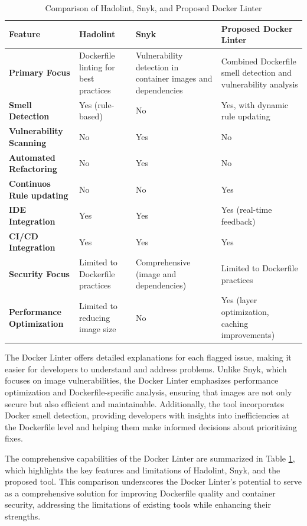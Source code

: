 \begin{table}[ht]
    \centering
        \begin{tabular}{|p{3.5cm}|p{3.5cm}|p{3.5cm}|p{3.5cm}|}
            \hline
            \textbf{Feature} & \textbf{Hadolint} & \textbf{Snyk} & \textbf{Proposed Docker Linter} \\ \hline
            \textbf{Primary Focus} & Dockerfile linting for best practices & Vulnerability detection in container images and dependencies & Combined Dockerfile smell detection and vulnerability analysis \\ \hline
            \textbf{Smell Detection} & Yes (rule-based) & No & Yes, with dynamic rule updating \\ \hline
            \textbf{Vulnerability Scanning} & No & Yes & No \\ \hline
            \textbf{Automated Refactoring} & No & Yes & No \\ \hline
            \textbf{Continuos Rule updating} & No & No & Yes \\ \hline
            \textbf{IDE Integration} & Yes & Yes & Yes (real-time feedback) \\ \hline
            \textbf{CI/CD Integration} & Yes & Yes & Yes \\ \hline
            \textbf{Security Focus} & Limited to Dockerfile practices & Comprehensive (image and dependencies) &Limited to Dockerfile practices \\ \hline
            \textbf{Performance Optimization} & Limited to reducing image size & No & Yes (layer optimization, caching improvements) \\ \hline
            \end{tabular}
        \caption{Comparison of Hadolint, Snyk, and Proposed Docker Linter}
        \label{tab:tool_comparison}
\end{table}

The Docker Linter offers detailed explanations for each flagged issue, making it easier for developers to understand and address problems. Unlike Snyk, which focuses on image vulnerabilities, the Docker Linter emphasizes performance optimization and Dockerfile-specific analysis, ensuring that images are not only secure but also efficient and maintainable. Additionally, the tool incorporates Docker smell detection, providing developers with insights into inefficiencies at the Dockerfile level and helping them make informed decisions about prioritizing fixes.

The comprehensive capabilities of the Docker Linter are summarized in Table \ref{tab:tool_comparison}, which highlights the key features and limitations of Hadolint, Snyk, and the proposed tool. This comparison underscores the Docker Linter’s potential to serve as a comprehensive solution for improving Dockerfile quality and container security, addressing the limitations of existing tools while enhancing their strengths.

